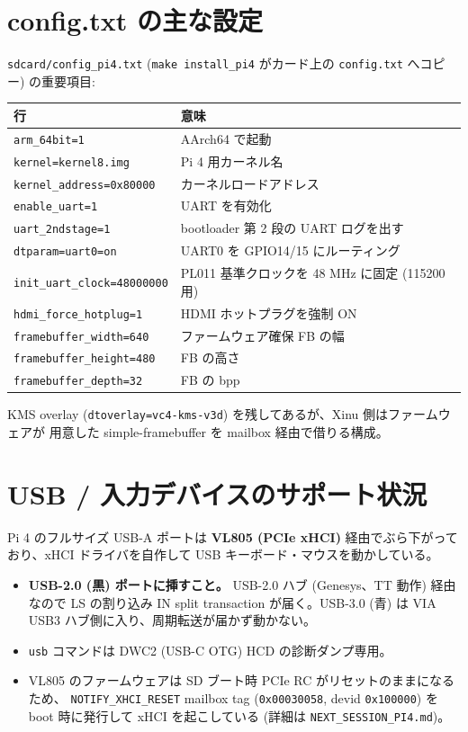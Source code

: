 \documentclass[a4paper,11pt]{ltjsarticle}
\begin{document}
\section{config.txt の主な設定}
\verb|sdcard/config_pi4.txt| (\verb|make install_pi4| がカード上の
\verb|config.txt| へコピー) の重要項目:
\begin{center}\footnotesize
\begin{tabular}{@{}l p{7.2cm}@{}}
\toprule
\textbf{行} & \textbf{意味}\\
\midrule
\verb|arm_64bit=1|              & AArch64 で起動\\
\verb|kernel=kernel8.img|       & Pi 4 用カーネル名\\
\verb|kernel_address=0x80000|   & カーネルロードアドレス\\
\verb|enable_uart=1|            & UART を有効化\\
\verb|uart_2ndstage=1|          & bootloader 第 2 段の UART ログを出す\\
\verb|dtparam=uart0=on|         & UART0 を GPIO14/15 にルーティング\\
\verb|init_uart_clock=48000000| & PL011 基準クロックを 48 MHz に固定 (115200 用)\\
\verb|hdmi_force_hotplug=1|     & HDMI ホットプラグを強制 ON\\
\verb|framebuffer_width=640|    & ファームウェア確保 FB の幅\\
\verb|framebuffer_height=480|   & FB の高さ\\
\verb|framebuffer_depth=32|     & FB の bpp\\
\bottomrule
\end{tabular}
\end{center}
KMS overlay (\verb|dtoverlay=vc4-kms-v3d|) を残してあるが、Xinu 側はファームウェアが
用意した simple-framebuffer を mailbox 経由で借りる構成。

\section{USB / 入力デバイスのサポート状況}
Pi 4 のフルサイズ USB-A ポートは \textbf{VL805 (PCIe xHCI)} 経由でぶら下がって
おり、xHCI ドライバを自作して USB キーボード・マウスを動かしている。
\begin{itemize}[leftmargin=1.4em,itemsep=1pt]
\item \textbf{USB-2.0 (黒) ポートに挿すこと。} USB-2.0 ハブ (Genesys、TT 動作)
  経由なので LS の割り込み IN split transaction が届く。USB-3.0 (青) は VIA USB3
  ハブ側に入り、周期転送が届かず動かない。
\item \verb|usb| コマンドは DWC2 (USB-C OTG) HCD の診断ダンプ専用。
\item VL805 のファームウェアは SD ブート時 PCIe RC がリセットのままになるため、
  \verb|NOTIFY_XHCI_RESET| mailbox tag (\verb|0x00030058|, devid \verb|0x100000|)
  を boot 時に発行して xHCI を起こしている (詳細は \verb|NEXT_SESSION_PI4.md|)。
\end{itemize}
\end{document}
